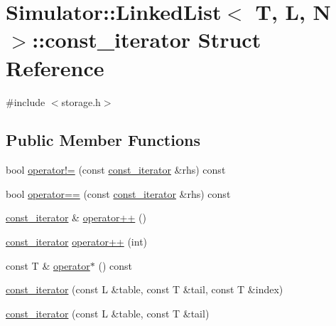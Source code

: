 \hypertarget{struct_simulator_1_1_linked_list_1_1const__iterator}{\section{Simulator\+:\+:Linked\+List$<$ T, L, N $>$\+:\+:const\+\_\+iterator Struct Reference}
\label{struct_simulator_1_1_linked_list_1_1const__iterator}
}


{\ttfamily \#include $<$storage.\+h$>$}

\subsection*{Public Member Functions}
\begin{DoxyCompactItemize}
\item 
bool \hyperlink{struct_simulator_1_1_linked_list_1_1const__iterator_ad6d6b56a45966ea1aa2c1b976a37c393}{operator!=} (const \hyperlink{struct_simulator_1_1_linked_list_1_1const__iterator}{const\+\_\+iterator} \&rhs) const 
\item 
bool \hyperlink{struct_simulator_1_1_linked_list_1_1const__iterator_a3615c2d67d13e409082f8b660005a310}{operator==} (const \hyperlink{struct_simulator_1_1_linked_list_1_1const__iterator}{const\+\_\+iterator} \&rhs) const 
\item 
\hyperlink{struct_simulator_1_1_linked_list_1_1const__iterator}{const\+\_\+iterator} \& \hyperlink{struct_simulator_1_1_linked_list_1_1const__iterator_a92638e494f39a5ca53c34c9282007614}{operator++} ()
\item 
\hyperlink{struct_simulator_1_1_linked_list_1_1const__iterator}{const\+\_\+iterator} \hyperlink{struct_simulator_1_1_linked_list_1_1const__iterator_ab6c51bcd990a4cadc867f32dc4e1d914}{operator++} (int)
\item 
const T \& \hyperlink{struct_simulator_1_1_linked_list_1_1const__iterator_afbe746ae767ccd13a950e44b054486f9}{operator$\ast$} () const 
\item 
\hyperlink{struct_simulator_1_1_linked_list_1_1const__iterator_a876be417ee8815d8be0d368103c399f1}{const\+\_\+iterator} (const L \&table, const T \&tail, const T \&index)
\item 
\hyperlink{struct_simulator_1_1_linked_list_1_1const__iterator_abd8d1471591a2a2690d9209dd22b13af}{const\+\_\+iterator} (const L \&table, const T \&tail)
\end{DoxyCompactItemize}
